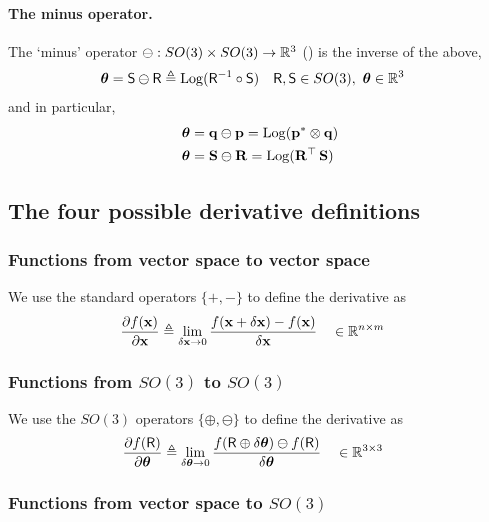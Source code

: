 \paragraph{The minus operator.}
The `minus' operator $\ominus:SO(3)\times SO(3)\to{\mathbb R}^3$ () is the inverse of the above,
%
\begin{align}
{{\bm \theta}}=\mathsf S\ominus \mathsf R
&\triangleq \operatorname*{Log}(\mathsf R^{-1} \circ \mathsf S)     && \mathsf R,\mathsf S\in SO(3),~ {{\bm \theta}}\in{\mathbb R}^3  
\end{align}
%
and in particular,
%
\begin{align}
{{\bm \theta}} &= {\bf q}\ominus{\bf p} = \operatorname*{Log}({\bf p}^*\otimes{\bf q})                      \\
{{\bm \theta}} &= {\bf S}\ominus{\bf R} = \operatorname*{Log}({\bf R}^{\top}\,{\bf S})                         
\end{align}



\subsection{The four possible derivative definitions}

\subsubsection{Functions from vector space to vector space}

We use the standard operators $\{+,-\}$ to define the derivative as
%
\begin{align}
\frac{\partial f({\bf x})}{\partial{\bf x}} &\triangleq \lim_{\delta{\bf x}\to0}\frac{f({\bf x}+\delta{\bf x})-f({\bf x})}{\delta{\bf x}} &&\in {\mathbb R}^{n\times m} \label{equ:derivative_vector}
\end{align}

\subsubsection{Functions from $SO(3)$ to $SO(3)$}

We use the $SO(3)$ operators $\{\oplus,\ominus\}$ to define the derivative as
%
\begin{align}
\frac{\partial f(\mathsf R)}{\partial{{\bm \theta}}} 
&\triangleq \lim_{\delta{{\bm \theta}}\to0}\frac{f(\mathsf R\oplus\delta{{\bm \theta}})\ominus f(\mathsf R)}{\delta{{\bm \theta}}}  && \in {\mathbb R}^{3\times 3}
\label{equ:derivative_SO3}
\end{align}

\subsubsection{Functions from vector space to $SO(3)$}

